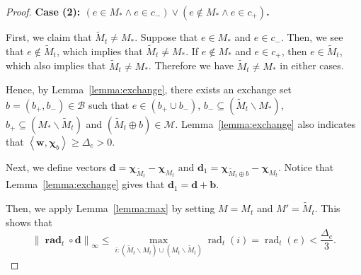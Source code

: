 \documentclass{article}
\newcommand{\M}{\mathcal M}
\newcommand{\B}{\mathcal B}
\newcommand{\del}{\backslash}
\DeclareMathOperator{\rad}{rad}
\newcommand{\inn}[1]{\left\langle #1 \right\rangle}
\newcommand{\nor}[1]{\left\|#1\right\|}
\renewcommand{\vec}[1]{\boldsymbol{#1}}
\renewcommand{\odot}{\circ}
\begin{document}
\begin{proof}
\textbf{Case (2): $(e \in M_* \wedge e\in c_-) \vee (e \not \in M_* \wedge e\in c_+)$.}

First, we claim that $\tilde M_t \not= M_*$.
Suppose that $e\in M_*$ and $e\in c_-$.
Then, we see that $e\not\in \tilde M_t$, which implies that $\tilde M_t\not=M_*$.
If $e\not \in M_*$ and $e\in c_+$, then $e\in \tilde M_t$, which also implies that $\tilde M_t\not= M_*$.
Therefore we have $\tilde M_t\not=M_*$ in either cases.


Hence, by Lemma~\ref{lemma:exchange}, there exists an exchange set $b=(b_+,b_-)\in \B$ such that 
$e \in (b_+ \cup b_-)$, $b_-\subseteq  (\tilde M_t \del M_*)$, $b_+ \subseteq (M_* \del \tilde M_t)$ and
$(\tilde M_t \oplus b) \in \M$.
Lemma~\ref{lemma:exchange} also indicates that $\inn{\vec w, \vec \chi_b} \ge \Delta_e > 0$.

Next, we define vectors $\vec d = \vec \chi_{\tilde M_t} - \vec \chi_{M_t}$ and $\vec d_1 = \vec\chi_{\tilde M_t\oplus b}-\vec\chi_{M_t}$.
Notice that Lemma~\ref{lemma:exchange} gives that $\vec d_1= \vec d+\vec b$.

Then, we apply Lemma~\ref{lemma:max} by setting $M = M_t$ and $M' = \tilde M_t$. 
This shows that 
\begin{equation}
\nor{\vec \rad_t\odot \vec d}_\infty \le \max_{i: (\tilde M_t \del M_t)\cup (M_t\del \tilde M_t)} \rad_t(i) = \rad_t(e) < \frac{\Delta_e}{3}.
\label{eq:u-c-2-0}
\end{equation}


\end{proof}
\end{document}
